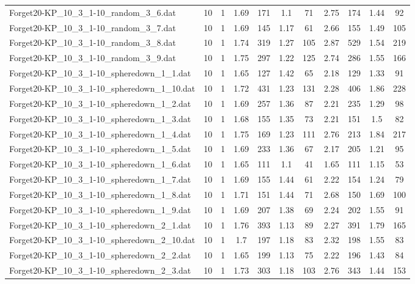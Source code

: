 \begin{table}[!ht]
\begin{tabular}{lcccccccccc}
Forget20-KP\_10\_3\_1-10\_random\_3\_6.dat & 10 & 1 & 1.69 & 171 & 1.1 & 71 & 2.75 & 174 & 1.44 & 92 \\
Forget20-KP\_10\_3\_1-10\_random\_3\_7.dat & 10 & 1 & 1.69 & 145 & 1.17 & 61 & 2.66 & 155 & 1.49 & 105 \\
Forget20-KP\_10\_3\_1-10\_random\_3\_8.dat & 10 & 1 & 1.74 & 319 & 1.27 & 105 & 2.87 & 529 & 1.54 & 219 \\
Forget20-KP\_10\_3\_1-10\_random\_3\_9.dat & 10 & 1 & 1.75 & 297 & 1.22 & 125 & 2.74 & 286 & 1.55 & 166 \\
Forget20-KP\_10\_3\_1-10\_spheredown\_1\_1.dat & 10 & 1 & 1.65 & 127 & 1.42 & 65 & 2.18 & 129 & 1.33 & 91 \\
Forget20-KP\_10\_3\_1-10\_spheredown\_1\_10.dat & 10 & 1 & 1.72 & 431 & 1.23 & 131 & 2.28 & 406 & 1.86 & 228 \\
Forget20-KP\_10\_3\_1-10\_spheredown\_1\_2.dat & 10 & 1 & 1.69 & 257 & 1.36 & 87 & 2.21 & 235 & 1.29 & 98 \\
Forget20-KP\_10\_3\_1-10\_spheredown\_1\_3.dat & 10 & 1 & 1.68 & 155 & 1.35 & 73 & 2.21 & 151 & 1.5 & 82 \\
Forget20-KP\_10\_3\_1-10\_spheredown\_1\_4.dat & 10 & 1 & 1.75 & 169 & 1.23 & 111 & 2.76 & 213 & 1.84 & 217 \\
Forget20-KP\_10\_3\_1-10\_spheredown\_1\_5.dat & 10 & 1 & 1.69 & 233 & 1.36 & 67 & 2.17 & 205 & 1.21 & 95 \\
Forget20-KP\_10\_3\_1-10\_spheredown\_1\_6.dat & 10 & 1 & 1.65 & 111 & 1.1 & 41 & 1.65 & 111 & 1.15 & 53 \\
Forget20-KP\_10\_3\_1-10\_spheredown\_1\_7.dat & 10 & 1 & 1.69 & 155 & 1.44 & 61 & 2.22 & 154 & 1.24 & 79 \\
Forget20-KP\_10\_3\_1-10\_spheredown\_1\_8.dat & 10 & 1 & 1.71 & 151 & 1.44 & 71 & 2.68 & 150 & 1.69 & 100 \\
Forget20-KP\_10\_3\_1-10\_spheredown\_1\_9.dat & 10 & 1 & 1.69 & 207 & 1.38 & 69 & 2.24 & 202 & 1.55 & 91 \\
Forget20-KP\_10\_3\_1-10\_spheredown\_2\_1.dat & 10 & 1 & 1.76 & 393 & 1.13 & 89 & 2.27 & 391 & 1.79 & 165 \\
Forget20-KP\_10\_3\_1-10\_spheredown\_2\_10.dat & 10 & 1 & 1.7 & 197 & 1.18 & 83 & 2.32 & 198 & 1.55 & 83 \\
Forget20-KP\_10\_3\_1-10\_spheredown\_2\_2.dat & 10 & 1 & 1.65 & 199 & 1.13 & 75 & 2.22 & 196 & 1.43 & 84 \\
Forget20-KP\_10\_3\_1-10\_spheredown\_2\_3.dat & 10 & 1 & 1.73 & 303 & 1.18 & 103 & 2.76 & 343 & 1.44 & 153 \\

\end{tabular}
\end{table}
